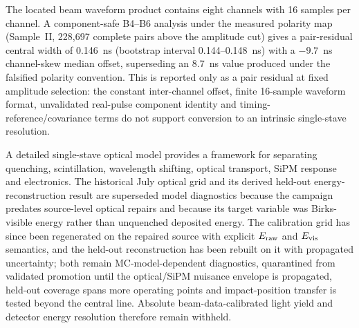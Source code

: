 The located beam waveform product contains eight channels with 16 samples per channel. A component-safe B4--B6 analysis under the measured polarity map (Sample~II, 228{,}697 complete pairs above the amplitude cut) gives a pair-residual central width of 0.146~ns (bootstrap interval 0.144--0.148~ns) with a $-9.7$~ns channel-skew median offset, superseding an 8.7~ns value produced under the falsified polarity convention. This is reported only as a pair residual at fixed amplitude selection: the constant inter-channel offset, finite 16-sample waveform format, unvalidated real-pulse component identity and timing-reference/covariance terms do not support conversion to an intrinsic single-stave resolution.

A detailed single-stave optical model provides a framework for separating quenching, scintillation, wavelength shifting, optical transport, SiPM response and electronics. The historical July optical grid and its derived held-out energy-reconstruction result are superseded model diagnostics because the campaign predates source-level optical repairs and because its target variable was Birks-visible energy rather than unquenched deposited energy. The calibration grid has since been regenerated on the repaired source with explicit $E_{\rm raw}$ and $E_{\rm vis}$ semantics, and the held-out reconstruction has been rebuilt on it with propagated uncertainty; both remain MC-model-dependent diagnostics, quarantined from validated promotion until the optical/SiPM nuisance envelope is propagated, held-out coverage spans more operating points and impact-position transfer is tested beyond the central line. Absolute beam-data-calibrated light yield and detector energy resolution therefore remain withheld.
